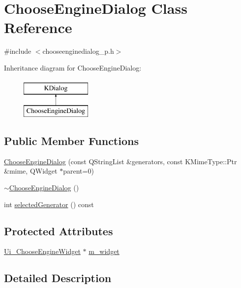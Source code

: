 \hypertarget{classChooseEngineDialog}{\section{Choose\+Engine\+Dialog Class Reference}
\label{classChooseEngineDialog}
}


{\ttfamily \#include $<$chooseenginedialog\+\_\+p.\+h$>$}

Inheritance diagram for Choose\+Engine\+Dialog\+:\begin{figure}[H]
\begin{center}
\leavevmode
\includegraphics[height=2.000000cm]{classChooseEngineDialog}
\end{center}
\end{figure}
\subsection*{Public Member Functions}
\begin{DoxyCompactItemize}
\item 
\hyperlink{classChooseEngineDialog_a7bd4304330f0562e881566800465bd89}{Choose\+Engine\+Dialog} (const Q\+String\+List \&generators, const K\+Mime\+Type\+::\+Ptr \&mime, Q\+Widget $\ast$parent=0)
\item 
\hyperlink{classChooseEngineDialog_ad8252242229073254e0c7474c6eab0db}{$\sim$\+Choose\+Engine\+Dialog} ()
\item 
int \hyperlink{classChooseEngineDialog_ab42687bbd730ae74a2bc865f0e5f06b4}{selected\+Generator} () const 
\end{DoxyCompactItemize}
\subsection*{Protected Attributes}
\begin{DoxyCompactItemize}
\item 
\hyperlink{classUi__ChooseEngineWidget}{Ui\+\_\+\+Choose\+Engine\+Widget} $\ast$ \hyperlink{classChooseEngineDialog_a9a8d24e5d7ce76f2b5d62e9d7a42f123}{m\+\_\+widget}
\end{DoxyCompactItemize}


\subsection{Detailed Description}



